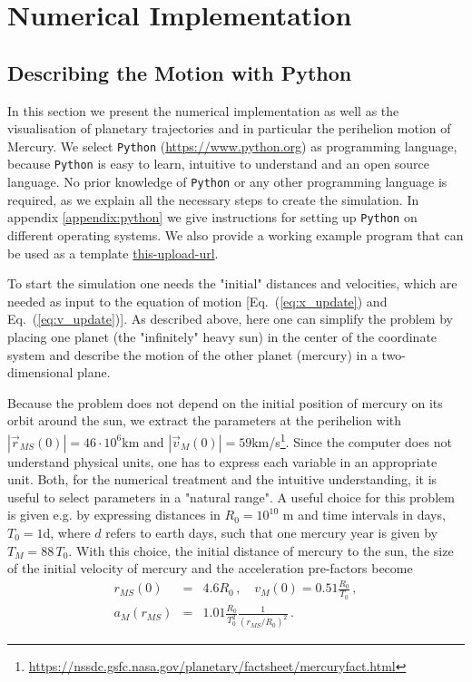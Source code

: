 \documentclass[12pt,ngerman,american]{iopart}
\newcommand{\python}[0]{\texttt{Python}}
\newcommand{\abs}[1]{\left\vert #1 \right\vert}
\begin{document}
\section{Numerical Implementation}\label{sec:Numerical Implementation}

\subsection{Describing the Motion with Python}

In this section we present the numerical implementation as well as the visualisation of planetary trajectories and in
particular
the perihelion motion of Mercury.  We select \python{} (\url{https://www.python.org}) as  programming language, because \python{} is easy to learn, intuitive to understand and an open source language.
No prior knowledge of \python{} or any other programming language is required, as we explain all the necessary steps to create the simulation.
In appendix \ref{appendix:python} we give instructions for setting up \python{} on different operating systems.
We also provide a working example program that can be used as a template \url{this-upload-url}.

To start the simulation one needs the "initial" distances and velocities, which are needed as input to the equation of motion [Eq.~(\ref{eq:x_update}) and Eq.~(\ref{eq:v_update})].
As described above, here  one can simplify the problem by placing one planet (the "infinitely" heavy sun) in the center of the coordinate system and describe the motion of the other planet (mercury) in a two-dimensional plane.  

Because the problem does not depend on the initial position of mercury on its orbit around the sun, we extract the parameters at the perihelion with $ \abs{\vec r_{MS}(0)} = 46 \cdot 10^6$km and $ \abs{\vec v_M(0)} = 59$km/s\footnote{\url{https://nssdc.gsfc.nasa.gov/planetary/factsheet/mercuryfact.html}}.
Since the computer does not understand physical units, one has to express each variable in an appropriate unit.
Both, for the numerical treatment and the intuitive understanding, it is useful to select parameters in a "natural range".
A useful choice for this problem is given e.g. by expressing distances in $R_0 = 10^{10}$ m and time intervals in days, $T_0 = 1$d, where $d$ refers to earth days, such that one mercury year is given by $T_M=88\,T_0$.
With this choice, the initial distance of mercury to the sun, the size of the initial velocity of mercury and the acceleration pre-factors become
\begin{eqnarray}
r_{MS}(0)   &=& 4.6 R_0 \, , \quad
v_{M}(0)    = 0.51 \frac{R_0}{T_0} \, ,  \\
a_M(r_{MS}) &=& 1.01 \frac{R_0}{T_0^2} \frac{1}{\left(r_{MS}/R_0\right)^2} 
\, .
\end{eqnarray}
\end{document}
